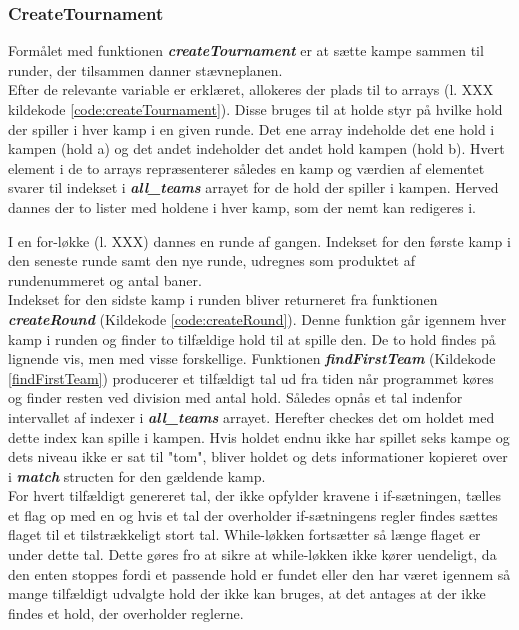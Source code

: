 \subsubsection{CreateTournament}
Formålet med funktionen \textbf{\textit{createTournament}} er at sætte kampe sammen til runder, der tilsammen danner stævneplanen. \\
Efter de relevante variable er erklæret, allokeres der plads til to arrays (l. XXX kildekode \ref{code:createTournament}). Disse bruges til at holde styr på hvilke hold der spiller i hver kamp i en given runde. Det ene array indeholde det ene hold i kampen (hold a) og det andet indeholder det andet hold kampen (hold b). Hvert element i de to arrays repræsenterer således en kamp og værdien af elementet svarer til indekset i \textbf{\textit{all\_teams}} arrayet for de hold der spiller i kampen. Herved dannes der to lister med holdene i hver kamp, som der nemt kan redigeres i.
\par
I en for-løkke (l. XXX) dannes en runde af gangen. Indekset for den første kamp i den seneste runde samt den nye runde, udregnes som produktet af rundenummeret og antal baner. \\
Indekset for den sidste kamp i runden bliver returneret fra funktionen \textbf{\textit{createRound}} (Kildekode \ref{code:createRound}). Denne funktion går igennem hver kamp i runden og finder to tilfældige hold til at spille den. De to hold findes på lignende vis, men med visse forskellige. Funktionen \textbf{\textit{findFirstTeam}} (Kildekode \ref{findFirstTeam}) producerer et tilfældigt tal ud fra tiden når programmet køres og finder resten ved division med antal hold. Således opnås et tal indenfor intervallet af indexer i \textbf{\textit{all\_teams}} arrayet. Herefter checkes det om holdet med dette index kan spille i kampen. Hvis holdet endnu ikke har spillet seks kampe og dets niveau ikke er sat til "tom", bliver holdet og dets informationer kopieret over i \textbf{\textit{match}} structen for den gældende kamp. \\
For hvert tilfældigt genereret tal, der ikke opfylder kravene i if-sætningen, tælles et flag op med en og hvis et tal der overholder if-sætningens regler findes sættes flaget til et tilstrækkeligt stort tal. While-løkken fortsætter så længe flaget er under dette tal. Dette gøres fro at sikre at while-løkken ikke kører uendeligt, da den enten stoppes fordi et passende hold er fundet eller den har været igennem så mange tilfældigt udvalgte hold der ikke kan bruges, at det antages at der ikke findes et hold, der overholder reglerne.\\
